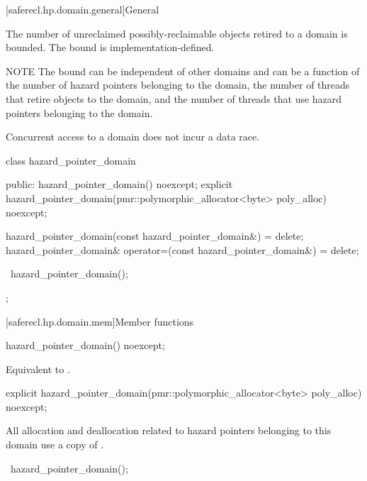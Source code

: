 [saferecl.hp.domain.general]{General}

The number of unreclaimed possibly-reclaimable objects retired to a domain is bounded.
The bound is implementation-defined.

NOTE The bound can be independent of other
domains and can be a function of the number of hazard pointers belonging to the
domain, the number of threads that retire objects to the domain, and the number of
threads that use hazard pointers belonging to the domain.

Concurrent access to a domain does not incur a data race. %

\begin{codeblock}
class hazard_pointer_domain {
public:
  hazard_pointer_domain() noexcept;
  explicit hazard_pointer_domain(pmr::polymorphic_allocator<byte> poly_alloc) noexcept;

  hazard_pointer_domain(const hazard_pointer_domain&) = delete;
  hazard_pointer_domain& operator=(const hazard_pointer_domain&) = delete;

  ~hazard_pointer_domain();
};
\end{codeblock}

[saferecl.hp.domain.mem]{Member functions}

\begin{itemdecl}
hazard_pointer_domain() noexcept;
\end{itemdecl}

\begin{itemdescr}

\effects 
Equivalent to .

\end{itemdescr}

\begin{itemdecl}
explicit hazard_pointer_domain(pmr::polymorphic_allocator<byte> poly_alloc) noexcept;
\end{itemdecl}

\begin{itemdescr}

\remarks 
All allocation and deallocation related to hazard pointers belonging to this
domain use a copy of .

\end{itemdescr}

\begin{itemdecl}
~hazard_pointer_domain();
\end{itemdecl}

